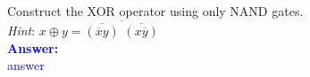 \item{}
Construct the XOR operator using only NAND gates.\\[6pt]
\emph{Hint}\/: $x\oplus y=\overline{\overline{(\overline{x}y)}\,\,
\overline{(x\overline{y})}}$\\[12pt]
\ifanswers
\textcolor{blue}{
\textbf{Answer:}\\
answer
}
\newpage
\fi

